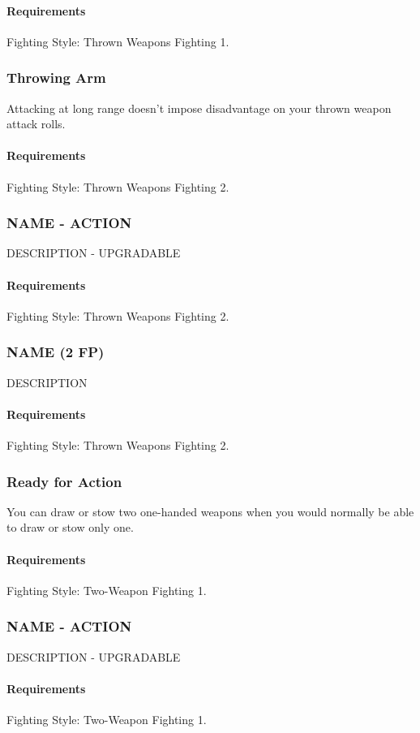    \paragraph{Requirements} Fighting Style: Thrown Weapons Fighting 1.
\subsubsection{Throwing Arm} \label{feat::throwingarm}
    Attacking at long range doesn't impose disadvantage on your thrown weapon attack rolls.
    \paragraph{Requirements} Fighting Style: Thrown Weapons Fighting 2.
\subsubsection{NAME - ACTION} \label{feat::name}
    DESCRIPTION - UPGRADABLE
    \paragraph{Requirements} Fighting Style: Thrown Weapons Fighting 2.
\subsubsection{NAME (2 FP)} \label{feat::name}
    DESCRIPTION
    \paragraph{Requirements} Fighting Style: Thrown Weapons Fighting 2.
\subsubsection{Ready for Action} \label{feat::readyforaction}
    You can draw or stow two one-handed weapons when you would normally be able to draw or stow only one.
    \paragraph{Requirements} Fighting Style: Two-Weapon Fighting 1.
\subsubsection{NAME - ACTION} \label{feat::name}
    DESCRIPTION - UPGRADABLE
    \paragraph{Requirements} Fighting Style: Two-Weapon Fighting 1.
